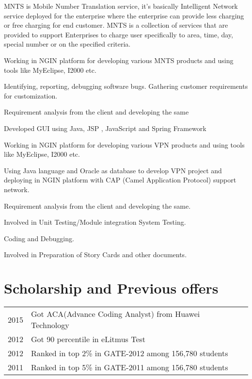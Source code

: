 \documentclass[]{prashant-resume-openfont}
\begin{document}
\begin{minipage}[t]{0.66\textwidth}
\begin{tightemize}\item MNTS is Mobile Number Translation service, it’s basically Intelligent Network service deployed for the enterprise where the enterprise can provide less charging or free charging for end customer. MNTS is a collection of services that are provided to support Enterprises to charge user specifically to area, time, day, special number or on the specified criteria.\item Working in NGIN platform for developing various MNTS products and using tools like MyEclipse, I2000 etc.\item Identifying, reporting, debugging software bugs. Gathering customer requirements for customization. \item Requirement analysis from the client and developing the same 
\end{tightemize} 
\sectionsep


\begin{tightemize}\item Developed GUI using Java, JSP , JavaScript and Spring Framework \item Working in NGIN platform for developing various VPN products and using tools like MyEclipse, I2000 etc.\item Using Java language and Oracle as database to develop VPN project and deploying in NGIN platform with CAP (Camel Application Protocol) support network. \item Requirement analysis from the client and developing the same.\item Involved in Unit Testing/Module integration System Testing.\item Coding and Debugging.\item Involved in Preparation of Story Cards and other documents.
\end{tightemize} 
\sectionsep



\section{Scholarship and Previous offers} 
\begin{tabular}{rll}
2015	     & Got ACA(Advance Coding Analyst) from Huawei Technology\\
2012	     & Got 90 percentile in eLitmus Test\\
2012	     & Ranked in top 2\% in GATE-2012 among 156,780 students\\
2011	     & Ranked in top 5\% in GATE-2011 among 156,780 students\\
\end{tabular}
\sectionsep


\sectionsep

\end{minipage} 
\end{document}
